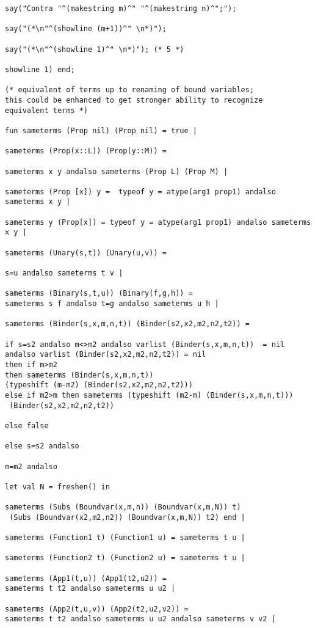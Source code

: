 \documentclass{article}
\begin{document}
{{\begin{verbatim}
say("Contra "^(makestring m)^" "^(makestring n)^";");

say("(*\n"^(showline (m+1))^" \n*)"); 

say("(*\n"^(showline 1)^" \n*)"); (* 5 *)

showline 1) end;

(* equivalent of terms up to renaming of bound variables;
this could be enhanced to get stronger ability to recognize
equivalent terms *)

fun sameterms (Prop nil) (Prop nil) = true |

sameterms (Prop(x::L)) (Prop(y::M)) =

sameterms x y andalso sameterms (Prop L) (Prop M) |

sameterms (Prop [x]) y =  typeof y = atype(arg1 prop1) andalso sameterms x y |

sameterms y (Prop[x]) = typeof y = atype(arg1 prop1) andalso sameterms x y |

sameterms (Unary(s,t)) (Unary(u,v)) =

s=u andalso sameterms t v |

sameterms (Binary(s,t,u)) (Binary(f,g,h)) =
sameterms s f andalso t=g andalso sameterms u h |

sameterms (Binder(s,x,m,n,t)) (Binder(s2,x2,m2,n2,t2)) =

if s=s2 andalso m<>m2 andalso varlist (Binder(s,x,m,n,t))  = nil
andalso varlist (Binder(s2,x2,m2,n2,t2)) = nil
then if m>m2 
then sameterms (Binder(s,x,m,n,t)) 
(typeshift (m-m2) (Binder(s2,x2,m2,n2,t2)))
else if m2>m then sameterms (typeshift (m2-m) (Binder(s,x,m,n,t))) 
 (Binder(s2,x2,m2,n2,t2))

else false

else s=s2 andalso                                                            

m=m2 andalso

let val N = freshen() in

sameterms (Subs (Boundvar(x,m,n)) (Boundvar(x,m,N)) t)
 (Subs (Boundvar(x2,m2,n2)) (Boundvar(x,m,N)) t2) end |

sameterms (Function1 t) (Function1 u) = sameterms t u |

sameterms (Function2 t) (Function2 u) = sameterms t u |

sameterms (App1(t,u)) (App1(t2,u2)) = 
sameterms t t2 andalso sameterms u u2 |

sameterms (App2(t,u,v)) (App2(t2,u2,v2)) = 
sameterms t t2 andalso sameterms u u2 andalso sameterms v v2 |


\end{verbatim}}}
\end{document}
